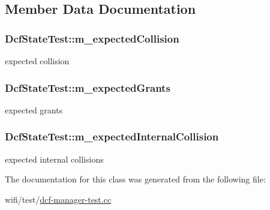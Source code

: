\subsection{Member Data Documentation}
\subsubsection[{\texorpdfstring{m\+\_\+expected\+Collision}{m_expectedCollision}}]{ Dcf\+State\+Test\+::m\+\_\+expected\+Collision\hspace{0.3cm}{\ttfamily [private]}}\hypertarget{classDcfStateTest_ac7319ab0fa8df5d6878710a13b439c7f}{}\label{classDcfStateTest_ac7319ab0fa8df5d6878710a13b439c7f}


expected collision 

\subsubsection[{\texorpdfstring{m\+\_\+expected\+Grants}{m_expectedGrants}}]{ Dcf\+State\+Test\+::m\+\_\+expected\+Grants\hspace{0.3cm}{\ttfamily [private]}}\hypertarget{classDcfStateTest_a53daefa6aae68aebc46b1e0798a0a126}{}\label{classDcfStateTest_a53daefa6aae68aebc46b1e0798a0a126}


expected grants 

\subsubsection[{\texorpdfstring{m\+\_\+expected\+Internal\+Collision}{m_expectedInternalCollision}}]{ Dcf\+State\+Test\+::m\+\_\+expected\+Internal\+Collision\hspace{0.3cm}{\ttfamily [private]}}\hypertarget{classDcfStateTest_ae10aeee5834f5953542abb8722aba1f7}{}\label{classDcfStateTest_ae10aeee5834f5953542abb8722aba1f7}


expected internal collisions 



The documentation for this class was generated from the following file\+:\begin{DoxyCompactItemize}
\item 
wifi/test/\hyperlink{dcf-manager-test_8cc}{dcf-\/manager-\/test.\+cc}\end{DoxyCompactItemize}

